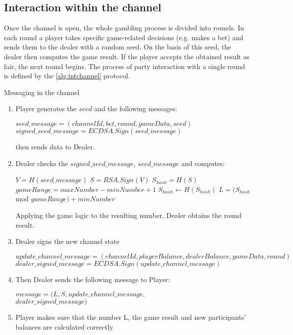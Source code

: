 \subsection {Interaction within the channel}

Once the channel is open, the whole gambling process is divided into rounds. In each round a player takes specific game-related decisions (e.g. makes a bet) and sends them to the dealer with a random seed. On the basis of this seed, the dealer then computes the game result. If the player accepts the obtained result as fair, the next round begins. The process of party interaction with a single round is defined by the \autoref{alg:intchannel} protocol. 

\begin{algorithm}
\caption{Messaging in the channel} \label{alg:intchannel}
\begin{enumerate}
	\item Player generates the $seed$ and the following  messages:
\begin{center}
$ seed\_message = (channelId, bet, round, gameData, seed)$
$signed\_seed\_message = ECDSA.Sign(seed\_message)$ 
\end{center}
 then sends data to Dealer. 
	\item Dealer checks the $signed\_seed\_message$, $seed\_message$ and computes:
 \begin{algorithmic}
\State $V = H(seed\_message)$
\State $S = RSA.Sign(V)$
\State $S_{hash} = H(S)$
\State $gameRange = maxNumber -  minNumber + 1$
\State$ S_{hash}\gets H(S_{hash})$
\EndWhile
\State $L = (S_{hash}$ mod $gameRange) + minNumber$
 \end{algorithmic}
 Applying the game logic to the resulting number, Dealer obtains the round result.
\item Dealer signs the new channel state
\begin{center}
$update\_channel\_message = (channelId, playerBalance, dealerBalance, gameData, round)$
$dealer\_signed\_message = ECDSA.Sign(update\_channel\_message)$
\end{center}
\item Then Dealer sends the following message to Player:
\begin{center}
 $message = (L,S, update\_channel\_message, $ \\ $dealer\_signed\_message)$
\end{center}
	\item Player makes sure that the number L, the game result and new participants' balances are calculated correctly.
\end{enumerate}
\end{algorithm}


